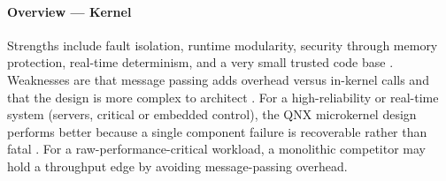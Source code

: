 \paragraph{Overview --- Kernel}

Strengths include fault isolation, runtime modularity, security through
memory protection, real-time determinism, and a very small trusted code
base \citep{bb_microkernel_dev, qnx_ham, qnx_neutrino_overview}.
Weaknesses are that message passing adds overhead versus in-kernel calls
and that the design is more complex to architect \citep{qnx_memman}.
For a high-reliability or real-time system (servers, critical or
embedded control), the QNX microkernel design performs better because a
single component failure is recoverable rather than fatal
\citep{qnx_ham, qnx_neutrino_overview}. For a raw-performance-critical
workload, a monolithic competitor may hold a throughput edge by avoiding
message-passing overhead.

